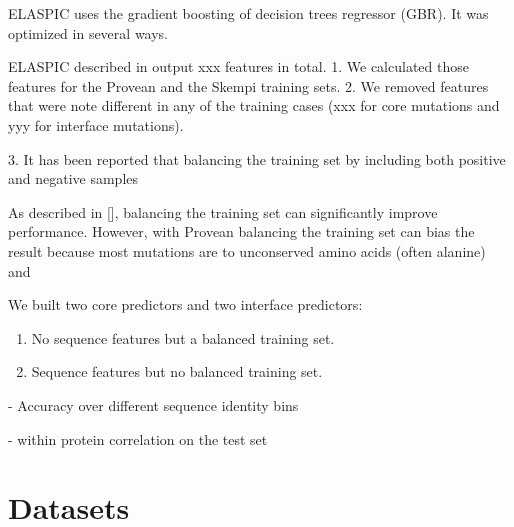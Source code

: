 
 \label{chap:results}

ELASPIC uses the gradient boosting of decision trees regressor (GBR). It was optimized in several ways.


ELASPIC described in  output xxx features in total.
1. We calculated those features for the Provean and the Skempi training sets.
2. We removed features that were note different in any of the training cases (xxx for core mutations and yyy for interface mutations).

3. It has been reported that balancing the training set by including both positive and negative samples


As described in [], balancing the training set can significantly improve performance. However, with Provean balancing the training set can bias the result because most mutations are to unconserved amino acids (often alanine) and



We built two core predictors and two interface predictors:

\begin{enumerate}
	\item No sequence features but a balanced training set.
	\item Sequence features but no balanced training set.
\end{enumerate}

- Accuracy over different sequence identity bins

- within protein correlation on the test set


\section{Datasets}


